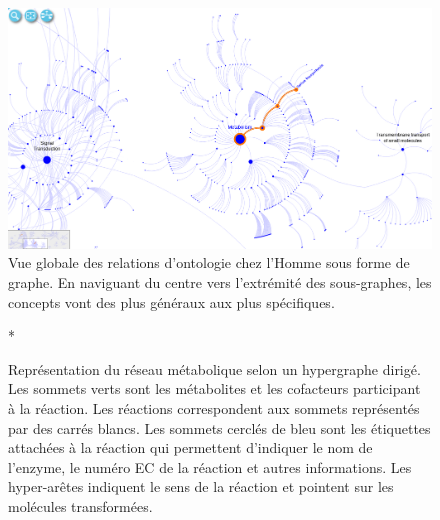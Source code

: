 \begin{refsegment}
    \begin{shadedfigure}[H]
        \begin{subfigure}[t]{\textwidth}
            \centering
            \includegraphics[width=\textwidth]{img/reactome_homo_sapiens_metabolism.png}
            \caption{ Vue globale des relations d'ontologie chez l'Homme sous forme de graphe. En naviguant du centre vers l'extrémité des sous-graphes, les concepts vont des plus généraux aux plus spécifiques. }
            \label{fig:reactome_metabolism}
        \end{subfigure}
    \newline
    \begin{subfigure}[b]{\textwidth}*
        \begin{minipage}[c]{0.58\textwidth}
            \caption{ Représentation du réseau métabolique selon un hypergraphe dirigé. Les sommets verts sont les métabolites et les cofacteurs participant à la réaction. Les réactions correspondent aux sommets représentés par des carrés blancs. Les sommets cerclés de bleu sont les étiquettes attachées à la réaction qui permettent d'indiquer le nom de l'enzyme, le numéro \gls{EC} de la réaction et autres informations. Les hyper-arêtes indiquent le sens de la réaction et pointent sur les molécules transformées. }
            \label{fig:reactome_serine}
        \end{minipage}\hfill
        \begin{minipage}[c]{0.38\textwidth}

\end{minipage}
\end{subfigure}
\end{shadedfigure}
\end{refsegment}

